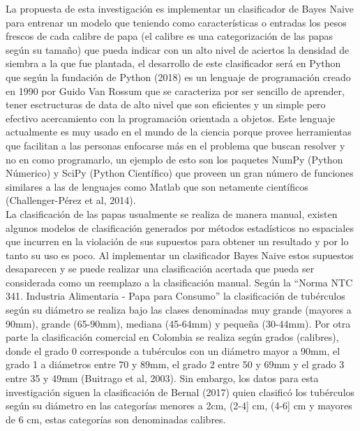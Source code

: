 La propuesta de esta investigación es implementar un clasificador de Bayes Naive para entrenar un modelo que teniendo como características o entradas los pesos frescos de cada calibre de papa (el calibre es una categorización de las papas según su tamaño) que pueda indicar con un alto nivel de aciertos la densidad de siembra a la que fue plantada, el desarrollo de este clasificador será en Python que según la fundación de Python (2018) es un lenguaje de programación creado en 1990 por Guido Van Rossum que se caracteriza por ser sencillo de aprender, tener esctructuras de data de alto nivel que son eficientes y un simple pero efectivo acercamiento con la programación orientada a objetos. Este lenguaje actualmente es muy usado en el mundo de la ciencia porque provee herramientas que facilitan a las personas enfocarse más en el problema que buscan resolver y no en como programarlo, un ejemplo de esto son los paquetes NumPy (Python Númerico) y SciPy (Python Científico) que proveen un gran número de funciones similares a las de lenguajes como Matlab que son netamente científicos (Challenger-Pérez et al, 2014).\\

La clasificación de las papas usualmente se realiza de manera manual, existen algunos modelos de clasificación generados por métodos estadísticos no espaciales que incurren en la violación de sus supuestos para obtener un resultado y por lo tanto su uso es poco. Al implementar un clasificador Bayes Naive estos supuestos desaparecen y se puede realizar una clasificación acertada que pueda ser considerada como un reemplazo a la clasificación manual. Según la "`Norma NTC 341. Industria Alimentaria - Papa para Consumo"' la clasificación de tubérculos según su diámetro se realiza bajo las clases denominadas muy grande (mayores a 90mm), grande (65-90mm), mediana (45-64mm) y pequeña (30-44mm). Por otra parte la clasificación comercial en Colombia se realiza según grados (calibres), donde el grado 0 corresponde a tubérculos con un diámetro mayor a 90mm, el grado 1 a diámetros entre 70 y 89mm, el grado 2 entre 50 y 69mm y el grado 3 entre 35 y 49mm (Buitrago et al, 2003). Sin embargo, los datos para esta investigación siguen la clasificación de Bernal (2017) quien clasificó los tubérculos según su diámetro en las categorías menores a 2cm, (2-4] cm, (4-6] cm y mayores de 6 cm, estas categorías son denominadas calibres.\\

